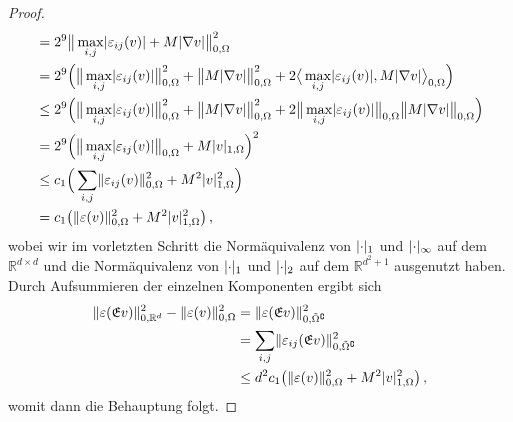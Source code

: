\documentclass{scrartcl}
\def\R{\mathbb{R}}
\def\e{\varepsilon}
\newcommand{\tiOmega}{\tilde{\Omega}}
\newcommand{\erw}{\mathfrak{E}}			%
\DeclarePairedDelimiter{\abs}{\lvert}{\rvert}
\DeclarePairedDelimiter{\norm}{\lVert}{\rVert}
\begin{document}
\begin{proof}
\begin{align*}
		&=  2^{9}\big\lVert\max_{i,j}\abs{\e_{ij}(v)}+M\abs{\nabla v}\big\rVert_{0,\Omega}^2 \\
		&=  2^{9}\Big(\big\lVert\max_{i,j}\abs{\e_{ij}(v)}\big\rVert_{0,\Omega}^2+\big\lVert M\abs{\nabla v}\big\rVert_{0,\Omega}^2+2\big\langle\max_{i,j}\abs{\e_{ij}(v)},M\abs{\nabla v}\big\rangle_{0,\Omega}\Big) \\
		&\leq  2^{9}\Big(\big\lVert\max_{i,j}\abs{\e_{ij}(v)}\big\rVert_{0,\Omega}^2+\big\lVert M\abs{\nabla v}\big\rVert_{0,\Omega}^2+2\big\lVert\max_{i,j}\abs{\e_{ij}(v)}\big\rVert_{0,\Omega}\big\lVert M\abs{\nabla v}\big\rVert_{0,\Omega}\Big) \\
		&=  2^{9}\Big(\big\lVert\max_{i,j}\abs{\e_{ij}(v)}\big\rVert_{0,\Omega}+M\abs{v}_{1,\Omega}\Big)^2 \\
		&\leq  c_1\Big(\sum_{i,j}\norm{\e_{ij}(v)}_{0,\Omega}^2+M^2\abs{v}_{1,\Omega}^2\Big) \\
		&=  c_1\big(\norm{\e(v)}_{0,\Omega}^2+M^2\abs{v}_{1,\Omega}^2\big)\,,
	\end{align*}
	wobei wir im vorletzten Schritt die Normäquivalenz von $\abs{\cdot}_1$ und $\abs{\cdot}_\infty$ auf dem $\R^{d\times d}$ und die Normäquivalenz von $\abs{\cdot}_1$ und $\abs{\cdot}_2$ auf dem $\R^{d^2+1}$ ausgenutzt haben.
	Durch Aufsummieren der einzelnen Komponenten ergibt sich
	\begin{align*}
		\norm{\e(\erw v)}_{0,\R^d}^2-\norm{\e(v)}_{0,\Omega}^2
		&= \norm{\e(\erw v)}_{0,\tiOmega^\complement}^2 \\
		&= \sum_{i,j}\norm{\e_{ij}(\erw v)}_{0,\tiOmega^\complement}^2 \\
		&\leq d^2c_1\big(\norm{\e(v)}_{0,\Omega}^2+M^2\abs{v}_{1,\Omega}^2\big)\,,
	\end{align*}
	womit dann die Behauptung folgt.
\end{proof}

\end{document}
